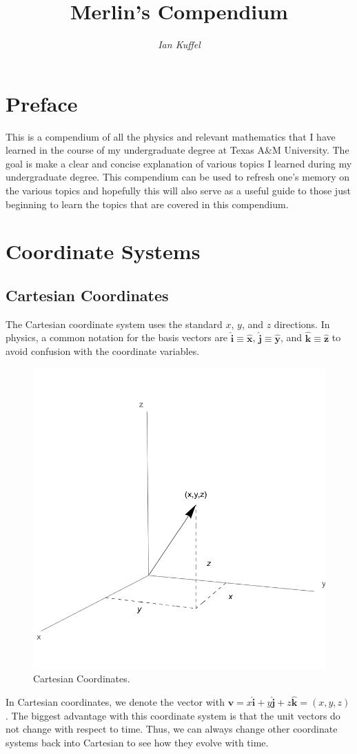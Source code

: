 \documentclass[oneside]{book}
\title{{\huge\bfseries Merlin's Compendium}}
\author{{\Large\itshape Ian Kuffel}}
\date{}
\numberwithin{figure}{section}
\numberwithin{equation}{section}
\newcommand{\bhat}[1]{\bm{\hat{#1}}}
\theoremstyle{definition}
\begin{document}
	\maketitle
	\tableofcontents
	\chapter*{Preface}
	This is a compendium of all the physics and relevant mathematics that I have learned in the course of my undergraduate degree at Texas A\&M University. The goal is make a clear and concise explanation of various topics I learned during my undergraduate degree. This compendium can be used to refresh one's memory on the various topics and hopefully this will also serve as a useful guide to those just beginning to learn the topics that are covered in this compendium.

	\chapter{Coordinate Systems}

	\section{Cartesian Coordinates}
	The Cartesian coordinate system uses the standard $ x $, $ y $, and $ z $ directions. In physics, a common notation for the basis vectors are $ \bhat{i} \equiv \bhat{x} $, $ \bhat{j} \equiv \bhat{y} $, and $ \bhat{k} \equiv \bhat{z} $ to avoid confusion with the coordinate variables.
	\begin{figure}[H]
		\centering
		\includegraphics[width=0.6\columnwidth]{Figures/Coordinates/Cartesian Coordinates.pdf}
		\caption{Cartesian Coordinates.}
		\label{fig:cart}
	\end{figure}
	In Cartesian coordinates, we denote the vector with $ \bm{v} = x\bhat{i} + y\bhat{j} + z\bhat{k} = (x,y,z) $. The biggest advantage with this coordinate system is that the unit vectors do not change with respect to time. Thus, we can always change other coordinate systems back into Cartesian to see how they evolve with time.
\end{document}
